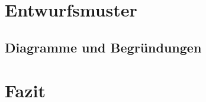 \documentclass[
10pt, %
a4paper, %
oneside, %
headinclude,footinclude, %
BCOR5mm, %
]{scrartcl}
\begin{document}
\section{Entwurfsmuster}
\subsection{Diagramme und Begründungen}

\section{Fazit}\label{sec:end}


%


\end{document}
